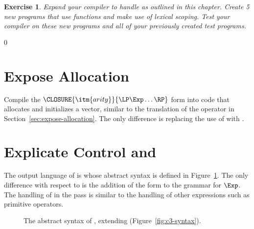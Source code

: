 \documentclass[7x10,nocrop]{TimesAPriori_MIT}%
\newcommand{\gray}[1]{{\color{gray} #1}}
\def\racketEd{0}
\def\edition{1}
\newtheorem{exercise}[theorem]{Exercise}
\begin{document}
\begin{exercise}\normalfont
Expand your compiler to handle \LangLam{} as outlined in this chapter.
Create 5 new programs that use  functions and make use of
lexical scoping. Test your compiler on these new programs and all of
your previously created test programs.
\end{exercise}

\if\edition\racketEd

\section{Expose Allocation}
\label{sec:expose-allocation-r5}

Compile the $\CLOSURE{\itm{arity}}{\LP\Exp\ldots\RP}$ form into code
that allocates and initializes a vector, similar to the translation of
the  operator in Section~\ref{sec:expose-allocation}.
The only difference is replacing the use of
 with
.


\section{Explicate Control and \LangCLam{}}
\label{sec:explicate-r5}

The output language of  is \LangCLam{} whose
abstract syntax is defined in Figure~\ref{fig:c4-syntax}.  The only
difference with respect to \LangCFun{} is the addition of the
 form to the grammar for $\Exp$.  The handling
of  in the  pass is
similar to the handling of other expressions such as primitive
operators.

\begin{figure}[tp]
\fbox{
\begin{minipage}{0.96\textwidth}
\small
{\if\edition\racketEd
\[
\begin{array}{lcl}
\Exp &::= & \ldots
   \MID \ALLOCCLOS{\Int}{\Type}{\Int} \\
\Stmt &::=& \gray{ \ASSIGN{\VAR{\Var}}{\Exp} 
       \MID \LP\key{Collect} \,\itm{int}\RP } \\
\Tail &::= & \gray{ \RETURN{\Exp} \MID \SEQ{\Stmt}{\Tail} 
       \MID \GOTO{\itm{label}} } \\
    &\MID& \gray{ \IFSTMT{\BINOP{\itm{cmp}}{\Atm}{\Atm}}{\GOTO{\itm{label}}}{\GOTO{\itm{label}}}  }\\
    &\MID& \gray{ \TAILCALL{\Atm}{\Atm\ldots} } \\
\Def &::=& \gray{ \DEF{\itm{label}}{\LP[\Var\key{:}\Type]\ldots\RP}{\Type}{\itm{info}}{\LP\LP\itm{label}\,\key{.}\,\Tail\RP\ldots\RP} }\\
\LangCLamM{} & ::= & \gray{ \PROGRAMDEFS{\itm{info}}{\LP\Def\ldots\RP} }
\end{array}
\]
\fi}
\end{minipage}
}
\caption{The abstract syntax of \LangCLam{}, extending \LangCFun{} (Figure~\ref{fig:c3-syntax}).}
\label{fig:c4-syntax}
\end{figure}
\end{document}
